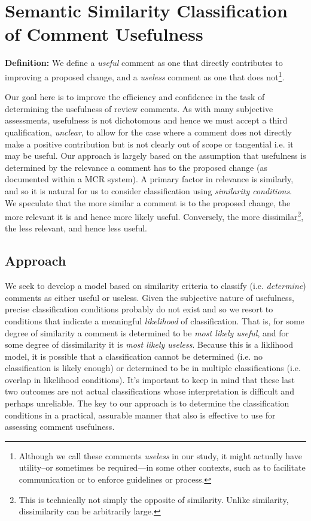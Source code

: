 
\section{Semantic Similarity Classification of Comment Usefulness}

\textbf{Definition:} We define a \emph{useful} comment as one that directly contributes to improving a proposed change, and a \emph{useless} comment as one that does not\footnote{Although we call these comments \emph{useless} in our study, it might actually have utility--or sometimes  be required---in some other contexts, such as to facilitate communication or to enforce guidelines or process.}.

Our goal here is to improve the efficiency and confidence in the task of determining the usefulness of review comments.
As with many subjective assessments, usefulness is not dichotomous and hence we must accept a third qualification, \emph{unclear}, to allow for the case where a comment does not directly make a positive contribution but is not clearly out of scope or tangential i.e. it may be useful.
Our approach is largely based on the assumption that usefulness is determined by the relevance a comment has to the proposed change (as documented within a MCR system).
A primary factor in relevance is similarly, and so it is natural for us to consider classification using \emph{similarity conditions}\cite{Davies2012}. 
We speculate that the more similar a comment is to the proposed change, the more relevant it is and hence more likely useful.
Conversely, the more dissimilar\footnote{This is technically not simply the opposite of similarity. Unlike similarity, dissimilarity can be arbitrarily large.}, the less relevant, and hence less useful.

\subsection{Approach}
We seek to develop a model based on similarity criteria to classify (i.e. \emph{determine}) comments as either useful or useless. 
Given the subjective nature of usefulness, precise classification conditions probably do not exist and so we resort to conditions that indicate a meaningful \emph{likelihood} of classification.
That is, for some degree of similarity a comment is determined to be \emph{most likely useful}, and for some degree of dissimilarity it is \emph{most likely useless}. Because this is a liklihood model, it is possible that a classification cannot be determined (i.e. no classification is likely enough) or determined to be in multiple classifications (i.e. overlap in likelihood conditions). It's important to keep in mind that these last two outcomes are not actual classifications whose interpretation is difficult and perhaps unreliable.     
The key to our approach is to determine the classification conditions in a practical, assurable manner that also is effective to use for assessing comment usefulness.

